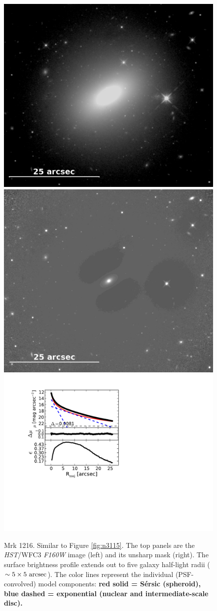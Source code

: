 \documentclass[useAMS,usenatbib,article]{mnras}
\begin{document}
\begin{figure}
\begin{center}
\includegraphics[width=0.49\columnwidth]{mrk1216_image.jpeg}
\includegraphics[width=0.49\columnwidth]{mrk1216_unsharp.jpeg} \\
\includegraphics[width=1.05\columnwidth]{mrk1216_decomposition.pdf}
\caption{Mrk 1216. 
Similar to Figure \ref{fig:n3115}. 
The top panels are the \emph{HST}/WFC3 \emph{F160W} image (left) and its unsharp mask (right).
The surface brightness profile extends out to five galaxy half-light radii ($\sim 5 \times 5~\rm arcsec$). 
The color lines represent the individual (PSF-convolved) model components:
{\bf red solid = S\'ersic (spheroid), blue dashed = exponential (nuclear and intermediate-scale disc). }
}
\label{fig:m1216}
\end{center}
\end{figure}
\end{document}
